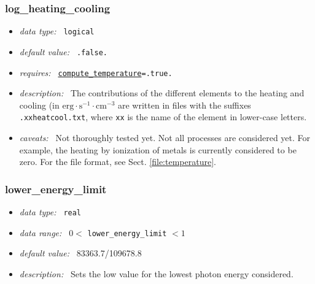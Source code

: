 \documentclass[a4paper,10pt]{article}
\begin{document}
\subsubsection{log\_heating\_cooling}
\label{opt:logheatingcooling}
\begin{itemize}
 \item \textit{data type:~} \texttt{logical}
 \item \textit{default value:~} \texttt{.false.}
 \item \textit{requires:~} 
 \texttt{\hyperref[opt:computetemperature]{compute\_temperature}=.true.}
 \item \textit{description:~} The contributions of the different elements to the 
  heating and cooling (in $\mathrm{erg \cdot s^{-1} \cdot cm^{-3}}$ are written 
  in files  with the suffixes \texttt{.xxheatcool.txt}, where \texttt{xx} is  
  the name of the element in lower-case letters.  
 \item \textit{caveats:~} Not thoroughly tested yet. Not all processes are 
  considered yet. For example, the heating by ionization of metals is currently 
  considered to be zero. For the file format, see  Sect. 
\ref{file:temperature}.
\end{itemize}



\subsubsection{lower\_energy\_limit}
\label{opt:lowerenergylimit}
\begin{itemize}
 \item \textit{data type:~} \texttt{real}
 \item \textit{data range:~} $0<$ \texttt{lower\_energy\_limit} $<1$
 \item \textit{default value:~} 83363.7/109678.8
 \item \textit{description:~} Sets the low value for the lowest photon energy 
considered. 
\end{itemize}
\end{document}
